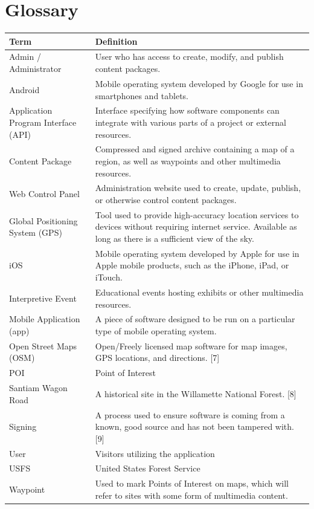 \documentclass[letterpaper, 10pt,titlepage]{article}
\begin{document}
\section{Glossary}
\newpage
\begin{table}[ht]
\begin{tabular}{| l | p{9cm} |}
\hline
\textbf{Term} & \textbf{Definition} \\ \hline
Admin / Administrator & User who has access to create, modify, and publish content packages. \\ \hline
Android & Mobile operating system developed by Google for use in smartphones and tablets. \\ \hline
Application Program Interface (API) & Interface specifying how software components can integrate with various parts of a project or external resources. \\ \hline
Content Package & Compressed and signed archive containing a map of a region, as well as waypoints and other multimedia resources. \\ \hline
Web Control Panel & Administration website used to create, update, publish, or otherwise control content packages. \\ \hline
Global Positioning System (GPS) & Tool used to provide high-accuracy location services to devices without requiring internet service. Available as long as there is a sufficient view of the sky. \\ \hline
iOS & Mobile operating system developed by Apple for use in Apple mobile products, such as the iPhone, iPad, or iTouch. \\ \hline
Interpretive Event & Educational events hosting exhibits or other multimedia resources. \\ \hline
Mobile Application (app) & A piece of software designed to be run on a particular type of mobile operating system. \\ \hline
Open Street Maps (OSM) & Open/Freely licensed map software for map images, GPS locations, and directions. {[}7{]} \\ \hline
POI & Point of Interest \\ \hline
Santiam Wagon Road & A historical site in the Willamette National Forest. [8] \\ \hline
Signing & A process used to ensure software is coming from a known, good source and has not been tampered with. [9]\\ \hline
User & Visitors utilizing the application \\ \hline
USFS & United States Forest Service \\ \hline
Waypoint & Used to mark Points of Interest on maps, which will refer to sites with some form of multimedia content. \\ \hline
\end{tabular}
\end{table} 
\end{document}
